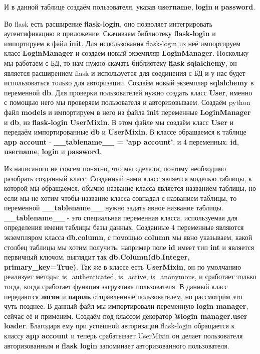 \documentclass[12pt, oldlfont, amsfonts]{report}
\begin{document}
И в данной таблице создаём пользователя, указав {\bf username}, {\bf login} и {\bf password}.

Во flask есть расширение {\bf flask-login}, оно позволяет интегрировать аутентификацию в приложение. Скачиваем библиотеку {\bf flask-login} и импортируем в файл {\bf init}. Для использования flask-login из неё импортируем класс {\bf LoginManager} и создаём новый экземпляр {\bf LoginManager}. Поскольку мы работаем с БД, то нам нужно скачать библиотеку {\bf flask sqlalchemy}, он является расширением flask и используется для соединения с БД и у нас будет использоваться только для авторизации. Создаём новый экземпляр {\bf sqlalchemy} в переменной {\bf db}. Для проверки пользователей нужно создать класс {\bf User}, именно с помощью него мы проверяем пользователя и авторизовываем. Создаём python файл {\bf models} и импортируем в него из файла {\bf init} переменные {\bf LoginManager} и {\bf db}, из {\bf flask-login} {\bf UserMixin}. В этом файле мы создаём класс {\bf User} и передаём импортированные {\bf db} и {\bf UserMixin}. В классе обращаемся к таблице {\bf app account} - {\bf \_\_tablename\_\_ = 'app account'}, и 4 переменных: {\bf id}, {\bf username}, {\bf login} и {\bf password}.

Из написаного не совсем понятно, что мы сделали, поэтому необходимо разобрать созданный класс. Созданный нами класс является моделью таблицы, к которой мы обращаемся, обычно название класса является названием таблицы, но если мы не хотим чтобы название класса совпадал с названием таблицы, то переменной {\bf \_\_tablename\_\_} нужно задать явное название таблицы. {\bf \_\_tablename\_\_} - это специальная переменная класса, используемая для определения имени таблицы базы данных. Созданные  4 переменные являются экземпляром класса {\bf db.column}, с помощью {\bf column} мы явно указываем, какой столбец таблицы мы хотим получить, например поле {\bf id} имеет тип {\bf int} и является первичный ключом, выглядит так {\bf db.Column(db.Integer, primary\_key=True)}. Так же в классе есть {\bf UserMixin}, он по умолчанию реализует методы: is\_authenticated, is\_active, is\_anonymous, и сработает только тогда, когда сработает функция загрузчика пользователя. В данный класс передаются {\bf логин} и {\bf пароль} отправленные пользователем, но рассмотрим это чуть позднее. В данный файл мы импортировали переменную {\bf login manager}, сейчас её и применим. Создаём под классом декоратор {\bf @login manager.user loader}. Благодаря ему при успешной авторизации {flask-login} обращается к классу {\bf app account} и теперь срабатывает {UserMixin} он делает пользователя авторизованным и {\bf flask login} запоминает авторизованного пользователя.
\end{document}
